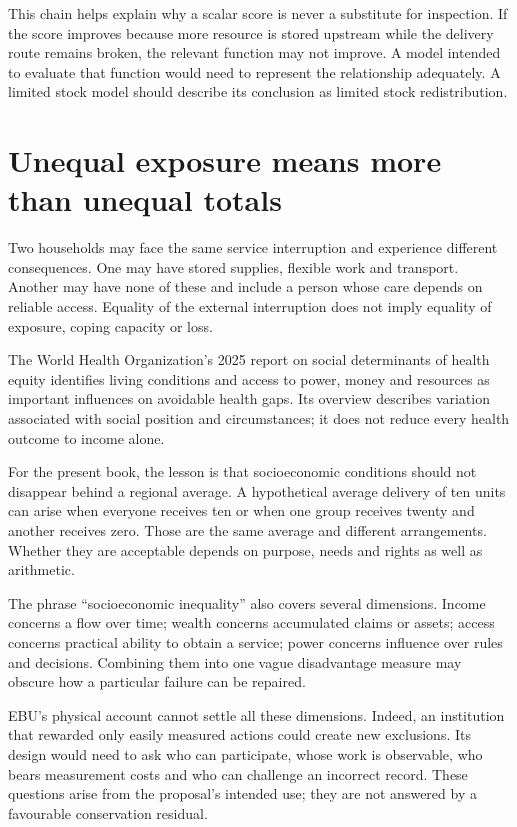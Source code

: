 This chain helps explain why a scalar score is never a substitute for inspection. If the score improves because more resource is stored upstream while the delivery route remains broken, the relevant function may not improve. A model intended to evaluate that function would need to represent the relationship adequately. A limited stock model should describe its conclusion as limited stock redistribution.

\section{Unequal exposure means more than unequal totals}
Two households may face the same service interruption and experience different consequences. One may have stored supplies, flexible work and transport. Another may have none of these and include a person whose care depends on reliable access. Equality of the external interruption does not imply equality of exposure, coping capacity or loss.

The World Health Organization's 2025 report on social determinants of health equity identifies living conditions and access to power, money and resources as important influences on avoidable health gaps. Its overview describes variation associated with social position and circumstances; it does not reduce every health outcome to income alone.\cite{intro-health}

For the present book, the lesson is that socioeconomic conditions should not disappear behind a regional average. A hypothetical average delivery of ten units can arise when everyone receives ten or when one group receives twenty and another receives zero. Those are the same average and different arrangements. Whether they are acceptable depends on purpose, needs and rights as well as arithmetic.

The phrase ``socioeconomic inequality'' also covers several dimensions. Income concerns a flow over time; wealth concerns accumulated claims or assets; access concerns practical ability to obtain a service; power concerns influence over rules and decisions. Combining them into one vague disadvantage measure may obscure how a particular failure can be repaired.

EBU's physical account cannot settle all these dimensions. Indeed, an institution that rewarded only easily measured actions could create new exclusions. Its design would need to ask who can participate, whose work is observable, who bears measurement costs and who can challenge an incorrect record. These questions arise from the proposal's intended use; they are not answered by a favourable conservation residual.

